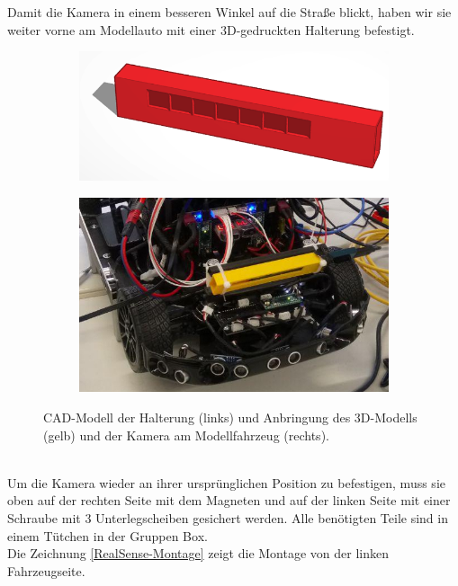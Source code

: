 \documentclass[a4paper,12pt]{report}
\begin{document}
Damit die Kamera in einem besseren Winkel auf die Straße blickt, haben wir sie weiter vorne am Modellauto mit einer 3D-gedruckten Halterung befestigt. 
\begin{figure}[ht]
	\centering
	\begin{subfigure}[c]{.45\textwidth}
		\includegraphics[width=\textwidth]{assets/Kamerahalterung.PNG}
	\end{subfigure}
	\begin{subfigure}[c]{.45\textwidth}
		\includegraphics[width=\textwidth]{assets/Kamera-Anbringung.jpg}
	\end{subfigure}
	\caption{CAD-Modell der Halterung (links) und Anbringung des 3D-Modells (gelb) und der Kamera am Modellfahrzeug (rechts).}
	\label{img-camera}
\end{figure}
\\
Um die Kamera wieder an ihrer ursprünglichen Position zu befestigen, muss sie oben auf der rechten Seite mit dem Magneten und auf der linken Seite mit einer Schraube mit 3 Unterlegscheiben gesichert werden.
Alle benötigten Teile sind in einem Tütchen in der Gruppen Box. \\
Die Zeichnung \ref{RealSense-Montage} zeigt die Montage von der linken Fahrzeugseite.
\end{document}
